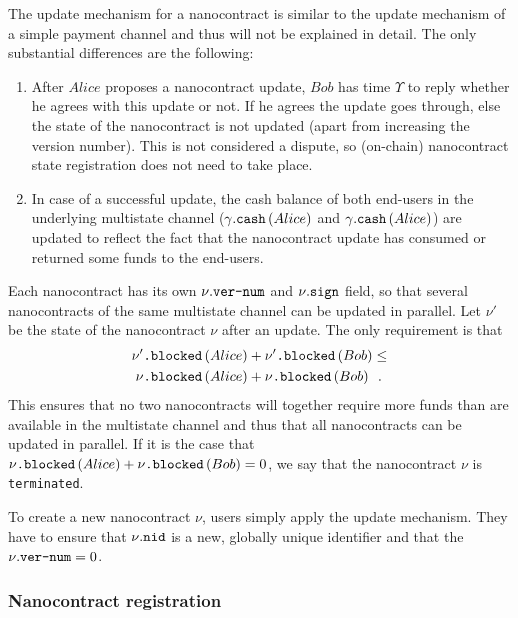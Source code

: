     The update mechanism for a nanocontract is similar to the update mechanism of a simple
    payment channel and thus will not be explained in detail. The only substantial
    differences are the following:
    \begin{enumerate}
      \item After $Alice$ proposes a nanocontract update, $Bob$ has time $\Upsilon$ to
      reply whether he agrees with this update or not. If he agrees the update goes
      through, else the state of the nanocontract is not updated (apart from increasing
      the version number). This is not considered a dispute, so (on-chain) nanocontract
      state registration does not need to take place.
      \item In case of a successful update, the cash balance of both end-users in the
      underlying multistate channel ($\gamma\mbox{.\texttt{cash}}\left(Alice\right)$ and
      $\gamma\mbox{.\texttt{cash}}\left(Alice\right)$) are updated to reflect the fact
      that the nanocontract update has consumed or returned some funds to the end-users.
    \end{enumerate}

    Each nanocontract has its own $\nu\mbox{.\texttt{ver-num}}$ and
    $\nu\mbox{.\texttt{sign}}$ field, so that several nanocontracts of the same multistate
    channel can be updated in parallel. Let $\nu'$ be the state of the nanocontract $\nu$
    after an update. The only requirement is that
    \begin{align*}
      \nu'\mbox{\texttt{.blocked}}\left(Alice\right) &+
      \nu'\mbox{\texttt{.blocked}}\left(Bob\right) \leq \\
      \nu\mbox{\texttt{.blocked}}\left(Alice\right) &+
      \nu\mbox{\texttt{.blocked}}\left(Bob\right) \enspace.
    \end{align*}
    This ensures that no two nanocontracts will together require more funds than are
    available in the multistate channel and thus that all nanocontracts can be updated in
    parallel. If it is the case that $\nu\mbox{\texttt{.blocked}}\left(Alice\right) +
    \nu\mbox{\texttt{.blocked}}\left(Bob\right) = 0$, we say that the nanocontract $\nu$
    is \texttt{terminated}.

    To create a new nanocontract $\nu$, users simply apply the update mechanism. They have
    to ensure that $\nu\mbox{.\texttt{nid}}$ is a new, globally unique identifier and that
    the $\nu\mbox{.\texttt{ver-num}} = 0$.

  \subsubsection{Nanocontract registration} \ \\

